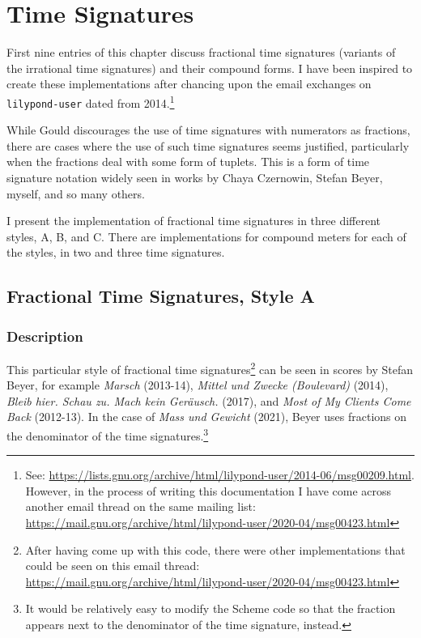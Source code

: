 

\chapter {Time Signatures}

First nine entries of this chapter discuss fractional time signatures (variants of the irrational time signatures) and their compound forms. I have been inspired to create these implementations after chancing upon the email exchanges on \verb|lilypond-user| dated from 2014.\footnote{See: \url{https://lists.gnu.org/archive/html/lilypond-user/2014-06/msg00209.html}. However, in the process of writing this documentation I have come across another email thread on the same mailing list: \url{https://mail.gnu.org/archive/html/lilypond-user/2020-04/msg00423.html} }

While Gould discourages the use of time signatures with numerators as fractions,\autocite[180]{RN1741} there are cases where the use of such time signatures seems justified, particularly when the fractions deal with some form of tuplets. This is a form of time signature notation widely seen in works by Chaya Czernowin, Stefan Beyer, myself, and so many others.

I present the implementation of fractional time signatures in three different styles, A, B, and C. There are implementations for compound meters for each of the styles, in two and three time signatures. 


\section {Fractional Time Signatures, Style A}
\label{sec:time_signatures}
\hfill
{}
\hfill

\subsection{Description}
This particular style of fractional time signatures\footnote{After having come up with this code, there were other implementations that could be seen on this email thread: \url{https://mail.gnu.org/archive/html/lilypond-user/2020-04/msg00423.html}} can be seen in scores by Stefan Beyer, for example \textit{Marsch} (2013-14),\autocite{RN1745} \textit{Mittel und Zwecke (Boulevard)} (2014),\autocite{RN1744} \textit{Bleib hier. Schau zu. Mach kein Geräusch.} (2017),\autocite{RN1743} and \textit{Most of My Clients Come Back} (2012-13).\autocite{RN1747} In the case of \textit{Mass und Gewicht} (2021), Beyer uses fractions on the denominator of the time signatures.\footnote{It would be relatively easy to modify the Scheme code so that the fraction appears next to the denominator of the time signature, instead.}

